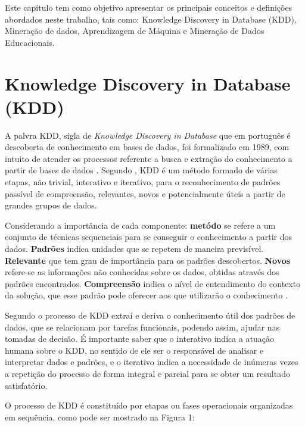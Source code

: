 \label{chapter:conceitos}
\par
Este capítulo tem como objetivo apresentar os principais conceitos e definições abordados neste trabalho, tais como: Knowledge Discovery in Database (KDD), Mineração de dados, Aprendizagem de Máquina e Mineração de Dados Educacionais.

\section{Knowledge Discovery in Database (KDD)}

A palvra KDD, sigla de \textit{Knowledge Discovery in Database} que em português é descoberta de conhecimento em bases de dados, foi formalizado em 1989, com intuito de atender os processos referente a busca e extração do conhecimento a partir de bases de dados \cite{Isamir2010}. Segundo , KDD é um método formado de várias etapas, não trivial, interativo e iterativo, para o reconhecimento de padrões passível de compreensão, relevantes, novos e potencialmente úteis a partir de grandes grupos de dados.

\par
Considerando a importância de cada componente: \textbf{metódo} se refere a um conjunto de técnicas sequenciais para se conseguir o conhecimento a partir dos dados. \textbf{Padrões} indica unidades que se repetem de maneira previsível. \textbf{Relevante} que tem grau de importância para os padrões descobertos. \textbf{Novos} refere-se as informações não conhecidas sobre os dados, obtidas através dos padrões encontrados. \textbf{Compreensão} indica o nível de entendimento do contexto da solução, que esse padrão pode oferecer aos que utilizarão o conhecimento \cite{Marques2014}.

\par
Segundo \cite{Isamir2010} o processo de KDD extraí e deriva o conhecimento útil dos padrões de dados, que se relacionam por tarefas funcionais, podendo assim, ajudar nas tomadas de decisão. É importante saber que o interativo indica a atuação humana sobre o KDD, no sentido de ele ser o responsável de analisar e interpretar dados e padrões, e o iterativo indica a necessidade de inúmeras vezes a repetição do processo de forma integral e parcial para se obter um resultado satisfatório.

\par
O processo de KDD é constituído por etapas ou fases operacionais organizadas em sequência, como pode ser mostrado na Figura 1:


